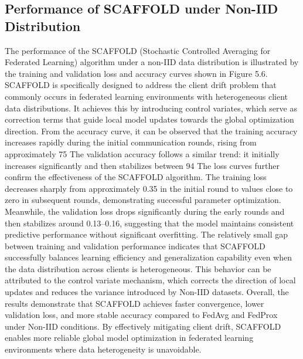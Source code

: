\documentclass[12pt]{book}
\begin{document}
\subsection{ Performance of SCAFFOLD under Non-IID Distribution}
The performance of the SCAFFOLD (Stochastic Controlled Averaging for Federated Learning) algorithm under a non-IID data distribution is illustrated by the training and validation loss and accuracy curves shown in Figure 5.6. SCAFFOLD is specifically designed to address the client drift problem that commonly occurs in federated learning environments with heterogeneous client data distributions. It achieves this by introducing control variates, which serve as correction terms that guide local model updates towards the global optimization direction.
From the accuracy curve, it can be observed that the training accuracy increases rapidly during the initial communication rounds, rising from approximately 75%
The validation accuracy follows a similar trend: it initially increases significantly and then stabilizes between 94%
The loss curves further confirm the effectiveness of the SCAFFOLD algorithm. The training loss decreases sharply from approximately 0.35 in the initial round to values close to zero in subsequent rounds, demonstrating successful parameter optimization. Meanwhile, the validation loss drops significantly during the early rounds and then stabilizes around 0.13–0.16, suggesting that the model maintains consistent predictive performance without significant overfitting.
The relatively small gap between training and validation performance indicates that SCAFFOLD successfully balances learning efficiency and generalization capability even when the data distribution across clients is heterogeneous. This behavior can be attributed to the control variate mechanism, which corrects the direction of local updates and reduces the variance introduced by Non-IID datasets.
Overall, the results demonstrate that SCAFFOLD achieves faster convergence, lower validation loss, and more stable accuracy compared to FedAvg and FedProx under Non-IID conditions. By effectively mitigating client drift, SCAFFOLD enables more reliable global model optimization in federated learning environments where data heterogeneity is unavoidable.
\end{document}
